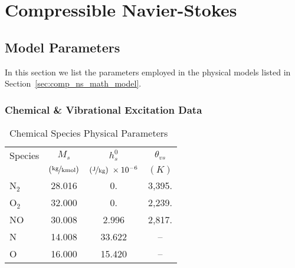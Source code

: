 \chapter{Compressible Navier-Stokes}
\section{Model Parameters}

In this section we list the parameters employed in the physical models listed in Section~\ref{sec:comp_ns_math_model}.

\subsection{Chemical \& Vibrational Excitation Data}

\begin{table}[hbtp]
  \begin{center}
    \caption{Chemical Species Physical Parameters~\cite{wright_thesis}}
    \vspace{1em}
    \begin{tabular}{|l|ccc|} \hline
      Species  & $M_s$ & $h^0_s$ & $\theta_{vs}$ \\
            & $\left(\unitfrac{kg}{kmol}\right)$ &  $\left(\unitfrac{J}{kg}\right)\; \times 10^{-6}$       & $\left(\unit{K}\right)$ \\ \hline \hline
      N$_2$ & 28.016  &  0.     & 3,395.         \\
      O$_2$ & 32.000  &  0.     & 2,239.         \\
      NO    & 30.008  &  2.996  & 2,817.         \\
      N     & 14.008  &  33.622 &  --            \\
      O     & 16.000  &  15.420 &  --            \\ \hline
    \end{tabular}
  \end{center}
\end{table}

\clearpage
